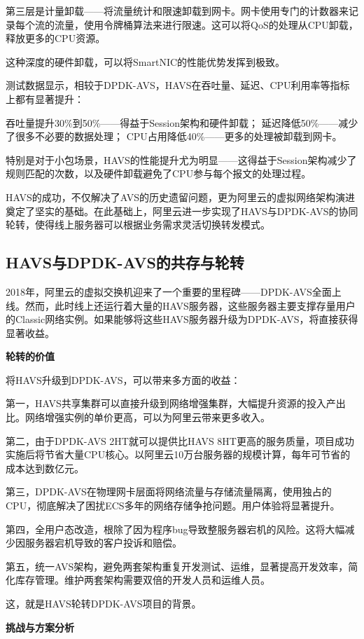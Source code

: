 第三层是计量卸载——将流量统计和限速卸载到网卡。网卡使用专门的计数器来记录每个流的流量，使用令牌桶算法来进行限速。这可以将QoS的处理从CPU卸载，释放更多的CPU资源。

这种深度的硬件卸载，可以将SmartNIC的性能优势发挥到极致。

测试数据显示，相较于DPDK-AVS，HAVS在吞吐量、延迟、CPU利用率等指标上都有显著提升：

吞吐量提升30\%到50\%——得益于Session架构和硬件卸载；
延迟降低50\%——减少了很多不必要的数据处理；
CPU占用降低40\%——更多的处理被卸载到网卡。

特别是对于小包场景，HAVS的性能提升尤为明显——这得益于Session架构减少了规则匹配的次数，以及硬件卸载避免了CPU参与每个报文的处理过程。

HAVS的成功，不仅解决了AVS的历史遗留问题，更为阿里云的虚拟网络架构演进奠定了坚实的基础。在此基础上，阿里云进一步实现了HAVS与DPDK-AVS的协同轮转，使得线上服务器可以根据业务需求灵活切换转发模式。

\subsection{HAVS与DPDK-AVS的共存与轮转}

2018年，阿里云的虚拟交换机迎来了一个重要的里程碑——DPDK-AVS全面上线。然而，此时线上还运行着大量的HAVS服务器，这些服务器主要支撑存量用户的Classic网络实例。如果能够将这些HAVS服务器升级为DPDK-AVS，将直接获得显著收益。

\textbf{轮转的价值}

将HAVS升级到DPDK-AVS，可以带来多方面的收益：

第一，HAVS共享集群可以直接升级到网络增强集群，大幅提升资源的投入产出比。网络增强实例的单价更高，可以为阿里云带来更多收入。

第二，由于DPDK-AVS 2HT就可以提供比HAVS 8HT更高的服务质量，项目成功实施后将节省大量CPU核心。以阿里云10万台服务器的规模计算，每年可节省的成本达到数亿元。

第三，DPDK-AVS在物理网卡层面将网络流量与存储流量隔离，使用独占的CPU，彻底解决了困扰ECS多年的网络存储争抢问题。用户体验将显著提升。

第四，全用户态改造，根除了因为程序bug导致整服务器宕机的风险。这将大幅减少因服务器宕机导致的客户投诉和赔偿。

第五，统一AVS架构，避免两套架构重复开发测试、运维，显著提高开发效率，简化库存管理。维护两套架构需要双倍的开发人员和运维人员。

这，就是HAVS轮转DPDK-AVS项目的背景。

\textbf{挑战与方案分析}

